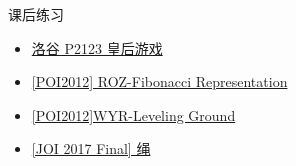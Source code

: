 \begin{frame}[fragile]{课后练习}
	\begin{itemize}
		\item \href{https://www.luogu.com.cn/problem/P2123}{洛谷 P2123 皇后游戏}
		\item \href{https://www.luogu.com.cn/problem/P3539}{[POI2012] ROZ-Fibonacci Representation}
		\item \href{https://www.luogu.com.cn/problem/P3543}{[POI2012]WYR-Leveling Ground}
		\item \href{https://www.luogu.com.cn/problem/P5101}{[JOI 2017 Final] 绳}
	\end{itemize}
\end{frame}